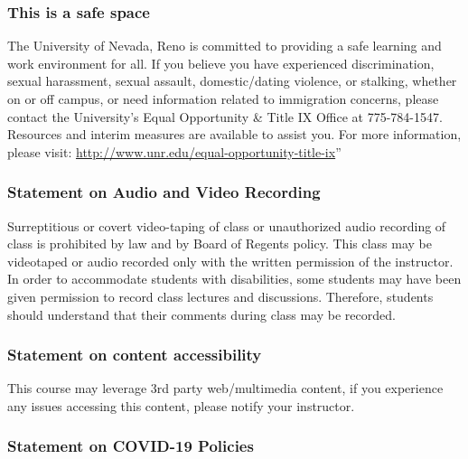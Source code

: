 \documentclass[
]{article}
\begin{document}
\hypertarget{this-is-a-safe-space}{%
\subsubsection{This is a safe space}\label{this-is-a-safe-space}}

The University of Nevada, Reno is committed to providing a safe learning
and work environment for all. If you believe you have experienced
discrimination, sexual harassment, sexual assault, domestic/dating
violence, or stalking, whether on or off campus, or need information
related to immigration concerns, please contact the University's Equal
Opportunity \& Title IX Office at 775-784-1547. Resources and interim
measures are available to assist you. For more information, please
visit: \url{http://www.unr.edu/equal-opportunity-title-ix}''

\hypertarget{statement-on-audio-and-video-recording}{%
\subsubsection{Statement on Audio and Video
Recording}\label{statement-on-audio-and-video-recording}}

Surreptitious or covert video-taping of class or unauthorized audio
recording of class is prohibited by law and by Board of Regents policy.
This class may be videotaped or audio recorded only with the written
permission of the instructor. In order to accommodate students with
disabilities, some students may have been given permission to record
class lectures and discussions. Therefore, students should understand
that their comments during class may be recorded.

\hypertarget{statement-on-content-accessibility}{%
\subsubsection{Statement on content
accessibility}\label{statement-on-content-accessibility}}

This course may leverage 3rd party web/multimedia content, if you
experience any issues accessing this content, please notify your
instructor.

\hypertarget{statement-on-covid-19-policies}{%
\subsubsection{Statement on COVID-19
Policies}\label{statement-on-covid-19-policies}}
\end{document}
